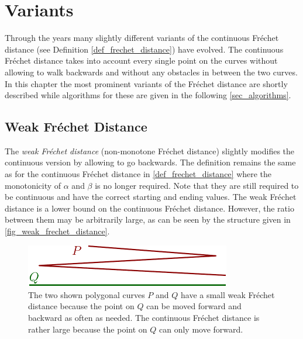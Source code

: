 \documentclass[
oneside,
fontsize=11pt
]{scrartcl}
\begin{document}
\section{Variants}
Through the years many slightly different variants of the continuous Fréchet distance (see Definition \ref{def_frechet_distance}) have evolved. 
The continuous Fréchet distance takes into account every single point on the curves 
without allowing to walk backwards 
and without any obstacles in between the two curves.
In this chapter the most prominent variants of the Fréchet distance are shortly described 
while algorithms for these are given in the following \autoref{sec_algorithms}.

\subsection{Weak Fréchet Distance}
\label{sec_weak_frechet_distance}
The \textit{weak Fréchet distance} (non-monotone Fréchet distance) 
slightly modifies the continuous version by allowing to go backwards. 
The definition remains the same as for the continuous Fréchet distance in \autoref{def_frechet_distance}
where the monotonicity of $\alpha$ and $\beta$ is no longer required.
Note that they are still required to be continuous and have the correct starting and ending values.
The weak Fréchet distance is a lower bound on the continuous Fréchet distance.
However, the ratio between them may be arbitrarily large, 
as can be seen by the structure given in \autoref{fig_weak_frechet_distance}. \cite{alt_computing_1995}

\begin{figure}[ht]
  \centering
  \includegraphics[width=0.8\textwidth]{images/frechet_distance/weak-frechet-distance-example.pdf}
  \caption{
    The two shown polygonal curves $P$ and $Q$ have a small weak Fréchet distance 
    because the point on $Q$ can be moved forward and backward as often as needed. 
    The continuous Fréchet distance is rather large 
    because the point on $Q$ can only move forward.}
  \label{fig_weak_frechet_distance}
\end{figure}



\end{document}
